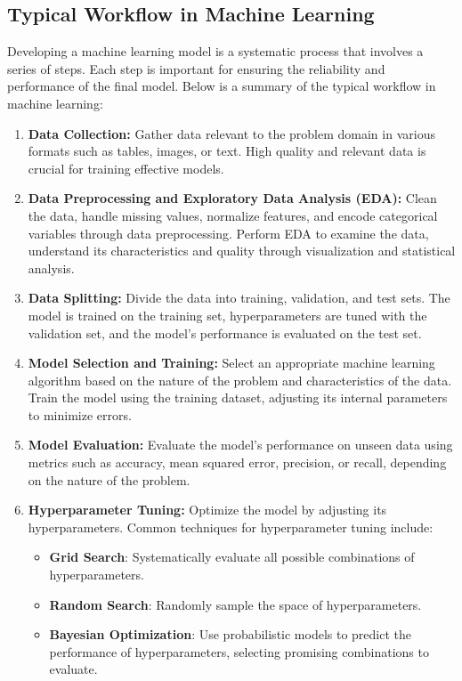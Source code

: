 \subsection{Typical Workflow in Machine Learning}
Developing a machine learning model is a systematic process that involves a series of steps. Each step is important for ensuring the reliability and performance of the final model. Below is a summary of the typical workflow in machine learning:

\begin{enumerate}
    \item \textbf{Data Collection:} Gather data relevant to the problem domain in various formats such as tables, images, or text. High quality and relevant data is crucial for training effective models.
    
    \item \textbf{Data Preprocessing and Exploratory Data Analysis (EDA):} Clean the data, handle missing values, normalize features, and encode categorical variables through data preprocessing. Perform EDA to examine the data, understand its characteristics and quality through visualization and statistical analysis.
    
    \item \textbf{Data Splitting:} Divide the data into training, validation, and test sets. The model is trained on the training set, hyperparameters are tuned with the validation set, and the model's performance is evaluated on the test set.
    
    \item \textbf{Model Selection and Training:} Select an appropriate machine learning algorithm based on the nature of the problem and characteristics of the data. Train the model using the training dataset, adjusting its internal parameters to minimize errors.
    
    \item \textbf{Model Evaluation:} Evaluate the model's performance on unseen data using metrics such as accuracy, mean squared error, precision, or recall, depending on the nature of the problem.
    
    \item \textbf{Hyperparameter Tuning:} Optimize the model by adjusting its hyperparameters. Common techniques for hyperparameter tuning include:
    \begin{itemize}
        \item \textbf{Grid Search}: Systematically evaluate all possible combinations of hyperparameters.
        \item \textbf{Random Search}: Randomly sample the space of hyperparameters.
        \item \textbf{Bayesian Optimization}: Use probabilistic models to predict the performance of hyperparameters, selecting promising combinations to evaluate.
    \end{itemize}
\end{enumerate}


